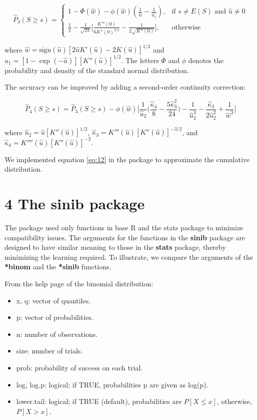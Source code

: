 \begin{equation}
\hat{P}_3(S \geq s)=
\begin{cases}
1-\Phi(\hat{w})-\phi(\hat{w}) (\frac{1}{\hat{w}} - \frac{1}{\hat{u_1}}), & \text{if } s \neq E(S) \text{ and } \hat{u} \neq 0 \\
\frac{1}{2} - \frac{1}{\sqrt{2 \pi}} \big[\frac{K'''(0)}{6 K''(0)^{3/2}} - \frac{1}{2 \sqrt{K''(0)}} \big], & \text{otherwise}
\end{cases}
\end{equation}

where $\hat{w}= \text{sign}(\hat{u}) [2 \hat{u} K'(\hat{u}) - 2K(\hat{u})]^{1/2}$ and $\hat{u}_1=[1-\exp(-\hat{u})][K''(\hat{u})]^{1/2}$. The letters $\Phi$ and $\phi$ denotes the probability and density of the standard normal distribution. 

The accuracy can be improved by adding a second-order continuity correction:

\begin{equation}
\hat{P}_4(S \geq s)=\hat{P}_3(S \geq s) - \phi(\hat{w}) \Big [ \frac{1}{\hat{u}_2} \Big ( \frac{\hat{\kappa}_4}{8} - \frac{5 \hat{\kappa}^2_3}{24} \Big ) - \frac{1}{\hat{u}_2^3} - \frac{\hat{\kappa}_3}{2 \hat{u}_2^2} + \frac{1}{\hat{w}^3} \Big]
\label{eq:12}
\end{equation}

where $\hat{u}_2=\hat{u}[K''(\hat{u})]^{1/2}$, $\hat{\kappa}_3=K'''(\hat{u}) [K''(\hat{u})]^{-3/2}$, and $\hat{\kappa}_4 = K''''(\hat{u}) [K''(\hat{u})]^{-2}$.

We implemented equation \ref{eq:12} in the package to approximate the cumulative distribution. 

\section{4 The \textbf{sinib} package}

The package used only functions in base R and the stats package to minimize compatibility issues. The arguments for the functions in the \textbf{sinib} package are designed to have similar meaning to those in the \textbf{stats} package, thereby minimizing the learning required. To illustrate, we compare the arguments of the \textbf{*binom} and the \textbf{*sinib} functions. 

From the help page of the binomial distribution: 

\begin{itemize}
\item x, q: vector of quantiles.
\item p: vector of probabilities.
\item n: number of observations. 
\item size: number of trials. 
\item prob: probability of success on each trial.
\item log, log.p: logical; if TRUE, probabilities p are given as log(p). 
\item lower.tail: logical; if TRUE (default), probabilities are $P[X \leq x]$, otherwise, $P[X > x]$. 
\end{itemize}

